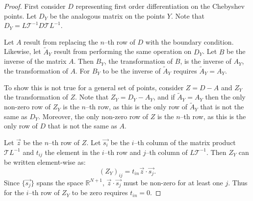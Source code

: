 \documentclass{sfuthesis}
\begin{document}
\begin{proof}
First consider $D$ representing first order differentiation on the Chebyshev points.
Let $D_Y$ be the analogous matrix on the points $Y$.
Note that $D_Y = L \mathcal{T}^{-1} D \mathcal{T} L^{-1}$.

Let $A$ result from replacing the $n$--th row of $D$ with the boundary condition.
Likewise, let $\tilde{A}_Y$ result from performing the same operation on $D_Y$.
Let $B$ be the inverse of the matrix $A$.
Then $B_Y$, the transformation of $B$, is the inverse of $A_Y$, the transformation of $A$.
For $B_Y$ to be the inverse of $\tilde{A}_Y$ requires $\tilde{A}_Y = A_Y$.

To show this is not true for a general set of points, consider $Z = D - A$ and $Z_Y$ the transformation of $Z$.
Note that $Z_Y = D_Y - A_Y$, and if $\tilde{A}_Y = A_Y$ then the only non-zero row of $Z_Y$ is the $n$--th row, as this is the only row of $\tilde{A}_Y$ that is not the same as $D_Y$.
Moreover, the only non-zero row of $Z$ is the $n$--th row, as this is the only row of $D$ that is not the same as $A$.

Let $\vec{z}$ be the $n$--th row of $Z$.
Let $\vec{s_i}$ be the $i$--th column of the matrix product $\mathcal{T}L^{-1}$ and $t_{ij}$ the element in the $i$--th row and $j$--th column of $L \mathcal{T}^{-1}$.
Then $Z_Y$ can be written element-wise as:
\begin{equation}
\left ( Z_Y \right )_{ij} = t_{in} \vec{z} \cdot \vec{s_j} .
\end{equation}
Since $\{\vec{s_j}\}$ spans the space $\mathbb{R}^{N+1}$, $\vec{z} \cdot \vec{s_j}$ must be non-zero for at least one $j$.
Thus for the $i$--th row of $Z_Y$ to be zero requires $t_{in} = 0$.


\end{proof}
\end{document}
